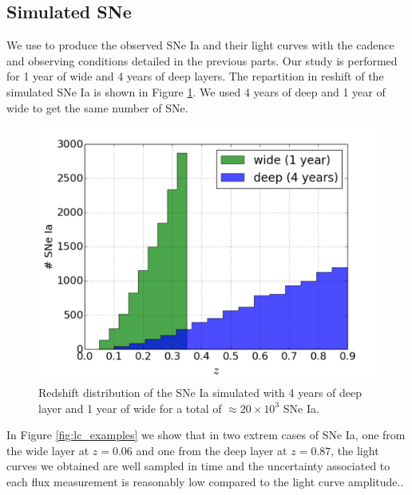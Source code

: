 \documentclass[\docopts]{\docclass}
\begin{document}
\subsection{Simulated SNe}
\label{ssec::snsim}
We use  to produce the observed SNe Ia and their light curves with the cadence and observing conditions detailed in the previous parts.
Our study is performed for 1 year of wide and 4 years of deep layers.
The repartition in reshift of the simulated SNe Ia is shown in Figure \ref{fig:z_distrib}. We used 4 years of deep and 1 year of wide to get the same number of SNe.
\begin{figure}[ht]
  \centering
  \includegraphics[width=\linewidth]{z_surveys_population.pdf}
  \caption{Redshift distribution of the SNe Ia simulated with 4 years of deep layer and 1 year of wide for a total of $\approx 20\times10^3$ SNe Ia.}
  \label{fig:z_distrib}
\end{figure}
In Figure \ref{fig:lc_examples} we show that in two extrem cases of SNe Ia, one from the wide layer at $z=0.06$ and one from the deep layer at $z=0.87$, the light curves we obtained are well sampled in time and the uncertainty associated to each flux measurement is reasonably low compared to the light curve amplitude..
\end{document}
